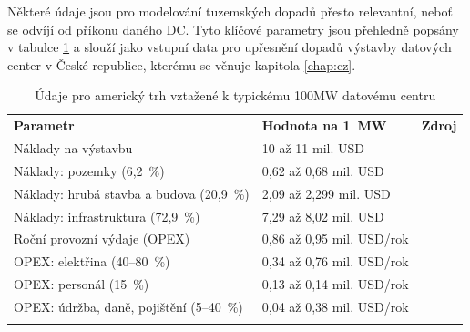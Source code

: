 Některé údaje jsou pro modelování tuzemských dopadů přesto relevantní, neboť se odvíjí od příkonu daného DC. Tyto klíčové parametry jsou přehledně popsány v tabulce \ref{tab:parametry_modelu_usa} a slouží jako vstupní data pro upřesnění dopadů výstavby datových center v České republice, kterému se věnuje kapitola \ref{chap:cz}.

\begin{landscape} \begin{table}[p] \centering \setlength{\tabcolsep}{26pt}

    \caption[Údaje získané z amerického trhu]{Údaje pro americký trh vztažené k typickému 100MW datovému centru}
    \label{tab:parametry_modelu_usa}

    \begin{tabular}{llc}
        \toprule
        \addlinespace
        \textbf{Parametr} & \textbf{Hodnota na 1~MW} & \textbf{Zdroj} \\
        
        \addlinespace
        \midrule
        \addlinespace

        Náklady na výstavbu & 10 až 11 mil. USD &~\cite{to_albertas_2025,gargano_subsidizing_2025} \\
        \quad Náklady: pozemky (6,2~\%) & 0,62 až 0,68 mil. USD &~\cite{pham_data_2017} \\
        \quad Náklady: hrubá stavba a budova (20,9~\%) & 2,09 až 2,299 mil. USD &~\cite{pham_data_2017} \\
        \quad Náklady: infrastruktura (72,9~\%) & 7,29 až 8,02 mil. USD &~\cite{pham_data_2017,ginzburg-ganz_technical_2025} \\

        \addlinespace
        \midrule
        \addlinespace

        Roční provozní výdaje (OPEX) & 0,86 až 0,95 mil. USD/rok &~\cite{pham_data_2017,to_albertas_2025} \\
        \quad OPEX: elektřina (40--80~\%) & 0,34 až 0,76 mil. USD/rok &~\cite{pham_data_2017,pratikkumar_dilipkumar_patel_artificial_2025} \\
        \quad OPEX: personál (15~\%) & 0,13 až 0,14 mil. USD/rok &~\cite{pham_data_2017} \\
        \quad OPEX: údržba, daně, pojištění (5--40~\%) & 0,04 až 0,38 mil. USD/rok &~\cite{pham_data_2017} \\

        \addlinespace
        \midrule
        \addlinespace


\end{tabular}
\end{table}
\end{landscape}
